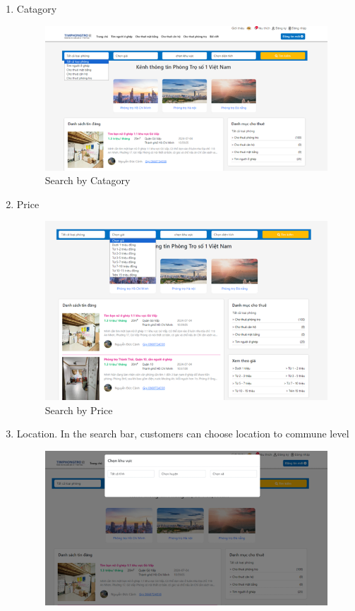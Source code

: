 \documentclass[../Main.tex]{subfiles}
\begin{document}
\begin{enumerate}
    \item Catagory
          \begin{figure}[H]
              \centering
              \includegraphics[width=\textwidth]{Figure/Picture22.png}
              \caption{Search by Catagory}
          \end{figure}
    \item Price
          \begin{figure}[H]
              \centering
              \includegraphics[width=\textwidth]{Figure/Picture23.png}
              \caption{Search by Price}
          \end{figure}
    \item Location.
          In the search bar, customers can choose location to commune level
          \begin{figure}[H]
              \centering
              \includegraphics[width=\textwidth]{Figure/Picture24.png}

\end{figure}
\end{enumerate}
\end{document}
